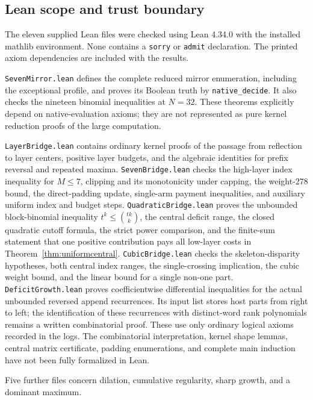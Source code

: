 \subsection{Lean scope and trust boundary}
The eleven supplied Lean files were checked using Lean 4.34.0 with the installed mathlib environment. None contains a \texttt{sorry} or \texttt{admit} declaration. The printed axiom dependencies are included with the results.

\texttt{SevenMirror.lean} defines the complete reduced mirror enumeration, including the exceptional profile, and proves its Boolean truth by \texttt{native\_decide}. It also checks the nineteen binomial inequalities at $N=32$. These theorems explicitly depend on native-evaluation axioms; they are not represented as pure kernel reduction proofs of the large computation.

\texttt{LayerBridge.lean} contains ordinary kernel proofs of the passage from reflection to layer centers, positive layer budgets, and the algebraic identities for prefix reversal and repeated maxima. \texttt{SevenBridge.lean} checks the high-layer index inequality for $M\le7$, clipping and its monotonicity under capping, the weight-278 bound, the direct-padding update, single-arm payment inequalities, and auxiliary uniform index and budget steps. \texttt{QuadraticBridge.lean} proves the unbounded block-binomial inequality $t^k\le\binom{tk}{k}$, the central deficit range, the closed quadratic cutoff formula, the strict power comparison, and the finite-sum statement that one positive contribution pays all low-layer costs in Theorem~\ref{thm:uniformcentral}. \texttt{CubicBridge.lean} checks the skeleton-disparity hypotheses, both central index ranges, the single-crossing implication, the cubic weight bound, and the linear bound for a single non-one part. \texttt{DeficitGrowth.lean} proves coefficientwise differential inequalities for the actual unbounded reversed append recurrences. Its input list stores host parts from right to left; the identification of these recurrences with distinct-word rank polynomials remains a written combinatorial proof. These use only ordinary logical axioms recorded in the logs. The combinatorial interpretation, kernel shape lemmas, central matrix certificate, padding enumerations, and complete main induction have not been fully formalized in Lean.

Five further files concern dilation, cumulative regularity, sharp
growth, and a dominant maximum.

